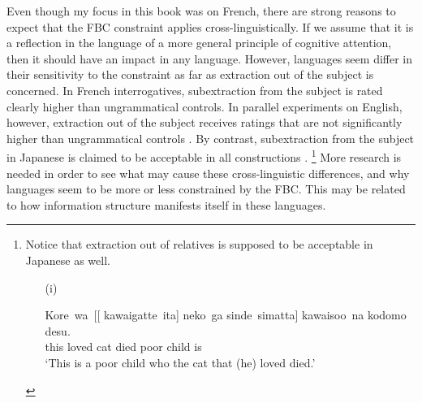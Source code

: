 Even though my focus in this book was on French, there are strong reasons to expect that the FBC constraint applies cross-linguistically. If we assume that it is a reflection in the language of a more general principle of cognitive attention, then it should have an impact in any language. However, languages seem differ in their sensitivity to the constraint as far as extraction out of the subject is concerned. In French interrogatives, subextraction from the subject is rated clearly higher than ungrammatical controls. In parallel experiments on English, however, extraction out of the subject receives ratings that are not significantly higher than ungrammatical controls \citep[third experiment]{Abeille.2020.Cognition}. By contrast, subextraction from the subject in Japanese is claimed to be acceptable in all constructions \citep[a.o.][]{Ross.1967,Kuno.1972,Kayne.1983,Stepanov.2007}.%
\footnote{Notice that extraction out of relatives is supposed to be acceptable in Japanese as well.
\begin{itemize}
    \item[(i)] \citep[15]{Kuno.1987}
    \item[] \gll Kore~wa~[[\trace{} kawaigatte~ita] neko~ga sinde~simatta] kawaisoo~na kodomo desu.\\
this loved cat died poor child is\\
\glt `This is a poor child who the cat that (he) loved died.'
\end{itemize}}
More research is needed in order to see what may cause these cross-linguistic differences, and why languages seem to be more or less constrained by the FBC. This may be related to how information structure manifests itself in these languages. 

